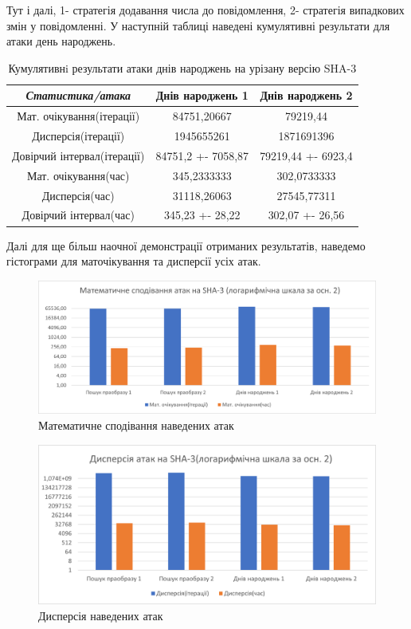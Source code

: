 \documentclass[12pt]{article}
\begin{document}
Тут і далі, 1- стратегія додавання числа до повідомлення, 2- стратегія випадкових змін у повідомленні. У наступній таблиці наведені кумулятивні результати для атаки день народжень.

\begin{center}
\begin{table}[H]
\centering
\begin{tabular}{|c|c|c|}
\hline
\textit{\textbf{Статистика/атака}} & Днів народжень 1     & Днів народжень 2     \\ \hline
Мат. очікування(ітерації)          & 84751,20667          & 79219,44             \\ \hline
Дисперсія(ітерації)                & 1945655261           & 1871691396           \\ \hline
Довірчий   інтервал(ітерації)      & 84751,2   +- 7058,87 & 79219,44   +- 6923,4 \\ \hline
Мат. очікування(час)               & 345,2333333          & 302,0733333          \\ \hline
Дисперсія(час)                     & 31118,26063          & 27545,77311          \\ \hline
Довірчий інтервал(час)             & 345,23 +- 28,22      & 302,07 +- 26,56      \\ \hline
\end{tabular}
\caption{Кумулятивнi результати атаки днів народжень на урізану версію SHA-3}
\label{tab:results_birthday}
\end{table}
\end{center}

Далі для ще більш наочної демонстрації отриманих результатів, наведемо гістограми для маточікування та дисперсії усіх атак. 

\begin{figure}[H]
    \centering
    \includegraphics[width=0.75\linewidth]{diagram1.png}
    \caption{Математичне сподівання наведених атак}
    \label{fig:enter-label1}
\end{figure}

\begin{figure}[H]
    \centering
    \includegraphics[width=0.75\linewidth]{diagram2.png}
    \caption{Дисперсія наведених атак}
    \label{fig:enter-label2}
\end{figure}
\end{document}
